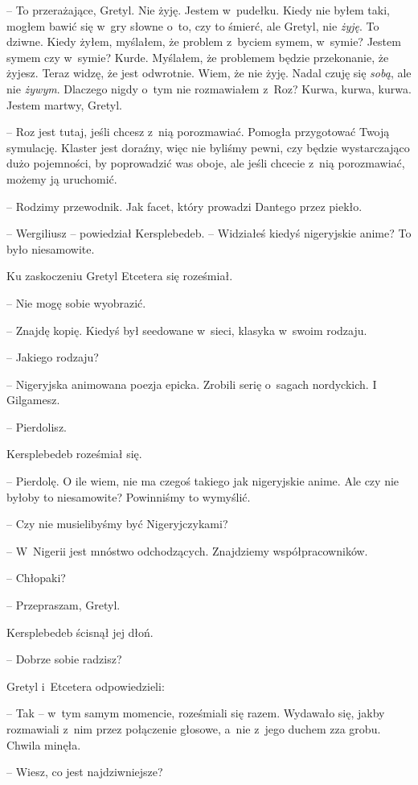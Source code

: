 \documentclass[oneside,polish,11pt,sfheadings]{mwbk}
\begin{document}
-- To przerażające, Gretyl. Nie żyję. Jestem w~pudełku. Kiedy nie byłem
taki, mogłem bawić się w~gry słowne o~to, czy to śmierć, ale Gretyl, nie
\textit{żyję}. To dziwne. Kiedy żyłem, myślałem, że problem z~byciem
symem, w~symie? Jestem symem czy w~symie? Kurde. Myślałem, że problemem
będzie przekonanie, że żyjesz. Teraz widzę, że jest odwrotnie. Wiem, że
nie żyję. Nadal czuję się \textit{sobą}, ale nie \textit{żywym}. Dlaczego
nigdy o~tym nie rozmawiałem z~Roz? Kurwa, kurwa, kurwa. Jestem martwy,
Gretyl.

-- Roz jest tutaj, jeśli chcesz z~nią porozmawiać. Pomogła przygotować
Twoją symulację. Klaster jest doraźny, więc nie byliśmy pewni, czy
będzie wystarczająco dużo pojemności, by poprowadzić was oboje, ale
jeśli chcecie z~nią porozmawiać, możemy ją uruchomić.

-- Rodzimy przewodnik. Jak facet, który prowadzi Dantego przez piekło.

-- Wergiliusz -- powiedział Kersplebedeb. -- Widziałeś kiedyś nigeryjskie
anime? To było niesamowite.

Ku zaskoczeniu Gretyl Etcetera się roześmiał. 

-- Nie mogę sobie
wyobrazić.

-- Znajdę kopię. Kiedyś był seedowane w~sieci, klasyka w~swoim rodzaju.

-- Jakiego rodzaju?

-- Nigeryjska animowana poezja epicka. Zrobili serię o~sagach nordyckich.
I Gilgamesz.

-- Pierdolisz.

Kersplebedeb roześmiał się. 

-- Pierdolę. O ile wiem, nie ma czegoś
takiego jak nigeryjskie anime. Ale czy nie byłoby to niesamowite?
Powinniśmy to wymyślić.

-- Czy nie musielibyśmy być Nigeryjczykami?

-- W~Nigerii jest mnóstwo odchodzących. Znajdziemy współpracowników.

-- Chłopaki?

-- Przepraszam, Gretyl.

Kersplebedeb ścisnął jej dłoń. 

-- Dobrze sobie radzisz?

Gretyl i~Etcetera odpowiedzieli: 

-- Tak -- w~tym samym momencie,
roześmiali się razem. Wydawało się, jakby rozmawiali z~nim przez
połączenie głosowe, a~nie z~jego duchem zza grobu. Chwila minęła.

-- Wiesz, co jest najdziwniejsze?
\end{document}
